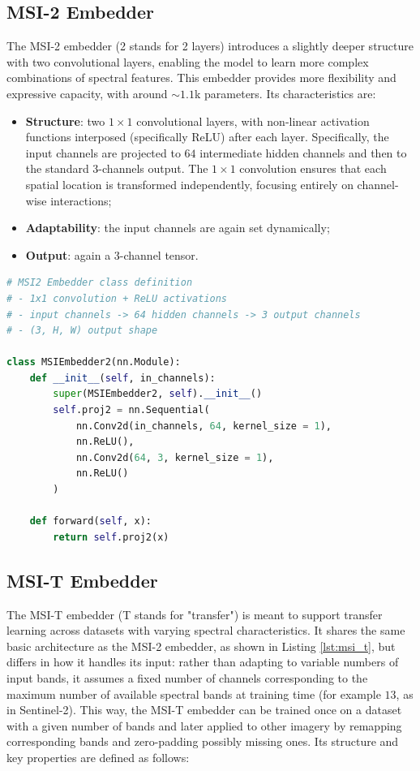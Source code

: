 \documentclass[a4paper, oneside, english]{sapthesis} %
\begin{document}
\subsection{MSI-2 Embedder}

The MSI-2 embedder (2 stands for 2 layers) introduces a slightly deeper structure with two convolutional layers, enabling the model to learn more complex combinations of spectral features. This embedder provides more flexibility and expressive capacity, with around $\sim 1.1$k parameters. Its characteristics are:

\begin{itemize}
    \item \textbf{Structure}: two $1\times1$ convolutional layers, with non-linear activation functions interposed (specifically ReLU) after each layer. Specifically, the input channels are projected to $64$ intermediate hidden channels and then to the standard 3-channels output. The $1\times1$ convolution ensures that each spatial location is transformed independently, focusing entirely on channel-wise interactions;
    \item \textbf{Adaptability}: the input channels are again set dynamically;
    \item \textbf{Output}: again a 3-channel tensor.
\end{itemize}


\begin{lstlisting}[language=Python, caption={MSI-2 Embedder implemented in PyTorch.}, label={lst:msi2}]
# MSI2 Embedder class definition
# - 1x1 convolution + ReLU activations
# - input channels -> 64 hidden channels -> 3 output channels
# - (3, H, W) output shape

class MSIEmbedder2(nn.Module):
    def __init__(self, in_channels):
        super(MSIEmbedder2, self).__init__()
        self.proj2 = nn.Sequential(
            nn.Conv2d(in_channels, 64, kernel_size = 1),
            nn.ReLU(),
            nn.Conv2d(64, 3, kernel_size = 1),
            nn.ReLU()
        )

    def forward(self, x):
        return self.proj2(x)
\end{lstlisting}


\subsection{MSI-T Embedder}

The MSI-T embedder (T stands for "transfer") is meant to support transfer learning across datasets with varying spectral characteristics. It shares the same basic architecture as the MSI-2 embedder, as shown in Listing \ref{lst:msi_t}, but differs in how it handles its input: rather than adapting to variable numbers of input bands, it assumes a fixed number of channels corresponding to the maximum number of available spectral bands at training time (for example $13$, as in Sentinel-2). This way, the MSI-T embedder can be trained once on a dataset with a given number of bands and later applied to other imagery by remapping corresponding bands and zero-padding possibly missing ones. Its structure and key properties are defined as follows:
\end{document}
